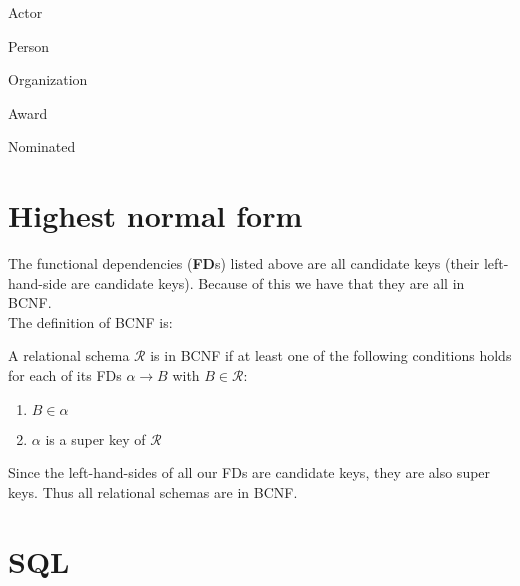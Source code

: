 {\begin{dependencies}{Actor}
\end{dependencies}

\begin{dependencies}{Person}
\end{dependencies}

\begin{dependencies}{Organization}
\end{dependencies}

\begin{dependencies}{Award}
\end{dependencies}

\begin{dependencies}{Nominated}
\end{dependencies}
}
\section{Highest normal form}
The functional dependencies (\textbf{FD}s) listed above are all candidate keys (their left-hand-side are candidate keys).
Because of this we have that they are all in BCNF.\\
The definition of BCNF is:
\begin{definition}
A relational schema $\mathcal{R}$ is in BCNF if at least one of the following conditions holds for each of its FDs $\alpha \rightarrow B$ with $B \in \mathcal{R}$:
\begin{enumerate}
\item $B \in \alpha$
\item $\alpha$ is a super key of $\mathcal{R}$
\end{enumerate}
\end{definition}
Since the left-hand-sides of all our FDs are candidate keys, they are also super keys.
Thus all relational schemas are in BCNF.
\section{SQL}